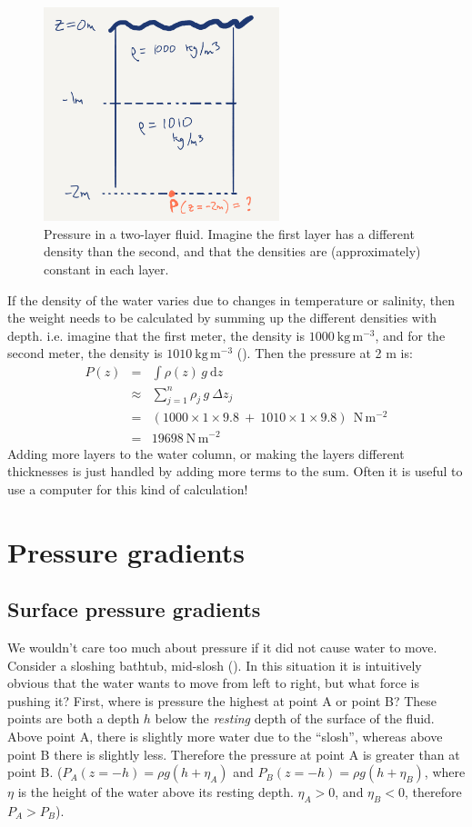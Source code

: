 \begin{figure}[htbp]
\includegraphics[width=2.7in]{figs/TwoDens.png}
\caption{Pressure in a two-layer fluid.  Imagine the first layer has a different density than the second, and that the densities are (approximately) constant in each layer.}
\label{fig:TwoDens}
\end{figure}

If the density of the water varies due to changes in temperature or salinity, then the weight needs to be calculated by summing up the different densities with depth.  i.e. imagine that the first meter, the density is $1000\ \mathrm{kg\,m^{-3}}$, and for the second meter, the density is $1010\ \mathrm{kg\,m^{-3}}$ ().  Then the pressure at 2 m is:
\begin{eqnarray}
  P(z)&=&\int \rho(z)\,g\ \mathrm{d}z\\
  &\approx&\sum_{j=1}^{n} \rho_{j}\, g\ \Delta z_{j}\\
  & =& (1000\times1\times9.8\ +\ 1010\times1\times9.8) \ \ \mathrm{N\,m^{-2}}\\
  &=& 19698\ \mathrm{N\,m^{-2}}
\end{eqnarray}
Adding more layers to the water column, or making the layers different thicknesses is just handled by adding more terms to the sum.  Often it is useful to use a computer for this kind of calculation!

\section{Pressure gradients}
\subsection{Surface pressure gradients}
\label{sec:pressure-gradients}

We wouldn't care too much about pressure if it did not cause water to move.  Consider a sloshing bathtub, mid-slosh ().  In this situation it is intuitively obvious that the water wants to move from left to right, but what force is pushing it?  First, where is pressure the highest at point A or point B?   These points are both a depth $h$ below the \emph{resting} depth of the surface of the fluid.  Above point A, there is slightly more water due to the ``slosh'', whereas above point B there is slightly less.  Therefore the pressure at point A is greater than at point B.  ($P_{A}(z=-h) = \rho g (h+\eta_{A})$ and $P_{B}(z=-h) = \rho g (h+\eta_{B})$, where $\eta$ is the height of the water above its resting depth. $\eta_{A}>0$, and $\eta_{B} <0$, therefore $P_{A}>P_{B}$).

